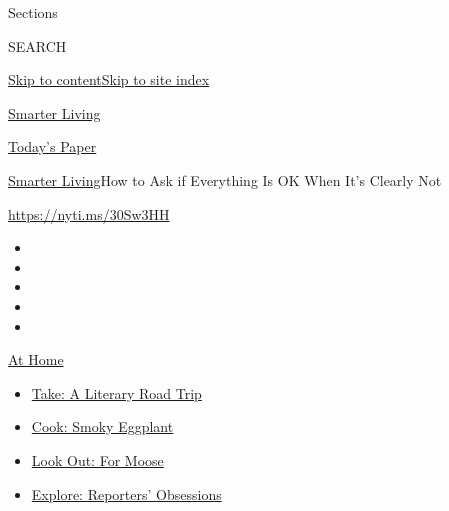 Sections

SEARCH

\protect\hyperlink{site-content}{Skip to
content}\protect\hyperlink{site-index}{Skip to site index}

\href{https://www.nytimes3xbfgragh.onion/section/smarter-living}{Smarter
Living}

\href{https://myaccount.nytimes3xbfgragh.onion/auth/login?response_type=cookie\&client_id=vi}{}

\href{https://www.nytimes3xbfgragh.onion/section/todayspaper}{Today's
Paper}

\href{/section/smarter-living}{Smarter Living}\textbar{}How to Ask if
Everything Is OK When It's Clearly Not

\url{https://nyti.ms/30Sw3HH}

\begin{itemize}
\item
\item
\item
\item
\item
\end{itemize}

\href{https://www.nytimes3xbfgragh.onion/spotlight/at-home?action=click\&pgtype=Article\&state=default\&region=TOP_BANNER\&context=at_home_menu}{At
Home}

\begin{itemize}
\tightlist
\item
  \href{https://www.nytimes3xbfgragh.onion/2020/07/28/books/time-for-a-literary-road-trip.html?action=click\&pgtype=Article\&state=default\&region=TOP_BANNER\&context=at_home_menu}{Take:
  A Literary Road Trip}
\item
  \href{https://www.nytimes3xbfgragh.onion/2020/07/29/magazine/bored-with-your-home-cooking-some-smoky-eggplant-will-fix-that.html?action=click\&pgtype=Article\&state=default\&region=TOP_BANNER\&context=at_home_menu}{Cook:
  Smoky Eggplant}
\item
  \href{https://www.nytimes3xbfgragh.onion/2020/07/27/travel/moose-michigan-isle-royale.html?action=click\&pgtype=Article\&state=default\&region=TOP_BANNER\&context=at_home_menu}{Look
  Out: For Moose}
\item
  \href{https://www.nytimes3xbfgragh.onion/interactive/2020/at-home/even-more-reporters-editors-diaries-lists-recommendations.html?action=click\&pgtype=Article\&state=default\&region=TOP_BANNER\&context=at_home_menu}{Explore:
  Reporters' Obsessions}
\end{itemize}

